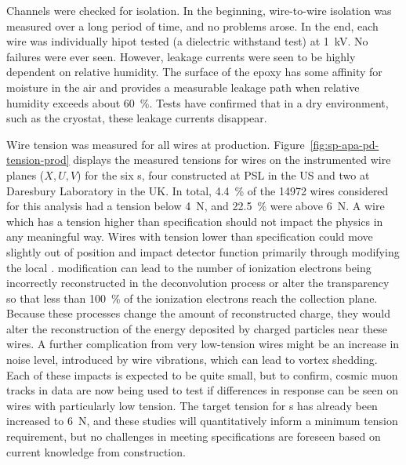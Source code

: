 Channels were checked for isolation.  In the beginning, wire-to-wire isolation was measured over a long period of time, and no problems arose.  In the end, each wire was individually hipot tested (a dielectric withstand test) at \SI{1}{kV}. No failures were ever seen. However, leakage currents were seen to be highly dependent on relative humidity.  The surface of the epoxy has some affinity for moisture in the air and provides a measurable leakage path when relative humidity exceeds about \SI{60}{\%}. Tests have confirmed that in a dry environment, such as the  cryostat, these leakage currents disappear.

Wire tension was measured for all wires at production.  Figure~\ref{fig:sp-apa-pd-tension-prod} displays the measured tensions for wires on the instrumented wire planes ($X, U, V$) for the six  s, four constructed at PSL in the US and two at Daresbury Laboratory in the UK.  %
In total, \SI{4.4}{\%} of the \num{14972} wires considered for this analysis had a tension below \SI{4}{N}, and \SI{22.5}{\%} were above \SI{6}{N}. 
A wire which has a tension higher than specification should not impact the physics in any meaningful way. Wires with tension lower than specification could move slightly out of position and impact detector function primarily through modifying the local \efield. \efield modification can lead to the number of ionization electrons being incorrectly reconstructed in the deconvolution process or alter the transparency so that less than \SI{100}{\%} of the ionization electrons reach the collection plane. Because these processes change the amount of reconstructed charge, they would alter the reconstruction of the energy deposited by charged particles near these wires. A further complication from very low-tension wires might be an increase in noise level, introduced by wire vibrations, which can lead to vortex shedding.  Each of these impacts is expected to be quite small, but to confirm, cosmic muon tracks in  data are now being used to test if differences in response can be seen on wires with particularly low tension.  The target tension for  s has already been increased to \SI{6}{N}, and these  studies will quantitatively inform a minimum tension requirement, but no challenges in meeting specifications are foreseen based on current knowledge from  construction.   




